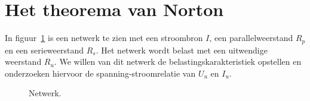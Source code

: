 \section{Het theorema van Norton}

In figuur~\ref{fig:gelnetwerkvoornorton} is een netwerk te zien met een stroombron $I$, een
parallelweerstand $R_p$ en een serieweerstand $R_s$. Het netwerk wordt belast met een uitwendige
weerstand $R_u$. We willen van dit netwerk de belastingskarakteristiek opstellen en onderzoeken
hiervoor de spanning-stroomrelatie van $U_u$ en $I_u$.

\begin{figure}[!ht]
\centering
{}
\caption{Netwerk.}
\label{fig:gelnetwerkvoornorton}
\end{figure}

